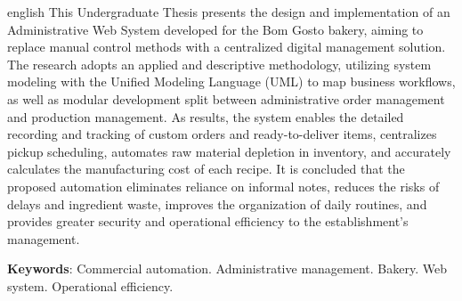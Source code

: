 \begin{resumo}[Abstract]			%
\begin{otherlanguage*}{english}		%
This Undergraduate Thesis presents the design and implementation of an Administrative Web System developed for the Bom Gosto bakery, aiming to replace manual control methods with a centralized digital management solution. The research adopts an applied and descriptive methodology, utilizing system modeling with the Unified Modeling Language (UML) to map business workflows, as well as modular development split between administrative order management and production management. As results, the system enables the detailed recording and tracking of custom orders and ready-to-deliver items, centralizes pickup scheduling, automates raw material depletion in inventory, and accurately calculates the manufacturing cost of each recipe. It is concluded that the proposed automation eliminates reliance on informal notes, reduces the risks of delays and ingredient waste, improves the organization of daily routines, and provides greater security and 
operational efficiency to the establishment's management. 

\vspace{\onelineskip}
\noindent
\textbf{Keywords}: Commercial automation. Administrative management. Bakery. Web system. Operational efficiency.
\end{otherlanguage*}
\end{resumo}

% 

%  
